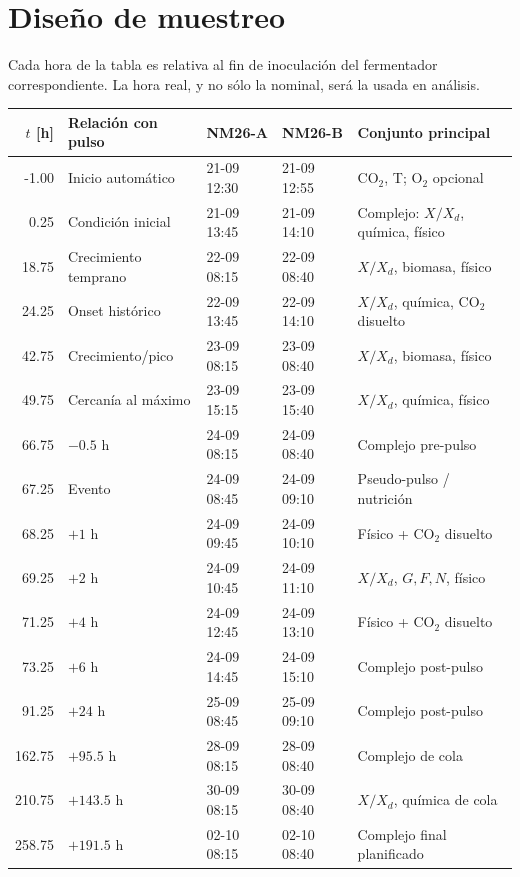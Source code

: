 \documentclass[11pt,a4paper]{article}
\begin{document}
\section{Diseño de muestreo}

Cada hora de la tabla es relativa al fin de inoculación del fermentador
correspondiente. La hora real, y no sólo la nominal, será la usada en análisis.

\begin{longtable}{@{}r l l l l@{}}
\toprule
\(t\) [h] & Relación con pulso & NM26-A & NM26-B & Conjunto principal\\
\midrule
\endhead
-1.00 & Inicio automático & 21-09 12:30 & 21-09 12:55 & CO$_2$, T; O$_2$ opcional\\
0.25 & Condición inicial & 21-09 13:45 & 21-09 14:10 & Complejo: \(X/X_d\), química, físico\\
18.75 & Crecimiento temprano & 22-09 08:15 & 22-09 08:40 & \(X/X_d\), biomasa, físico\\
24.25 & Onset histórico & 22-09 13:45 & 22-09 14:10 & \(X/X_d\), química, CO$_2$ disuelto\\
42.75 & Crecimiento/pico & 23-09 08:15 & 23-09 08:40 & \(X/X_d\), biomasa, físico\\
49.75 & Cercanía al máximo & 23-09 15:15 & 23-09 15:40 & \(X/X_d\), química, físico\\
66.75 & \(-0.5\) h & 24-09 08:15 & 24-09 08:40 & Complejo pre-pulso\\
67.25 & Evento & 24-09 08:45 & 24-09 09:10 & Pseudo-pulso / nutrición\\
68.25 & \(+1\) h & 24-09 09:45 & 24-09 10:10 & Físico + CO$_2$ disuelto\\
69.25 & \(+2\) h & 24-09 10:45 & 24-09 11:10 & \(X/X_d\), \(G,F,N\), físico\\
71.25 & \(+4\) h & 24-09 12:45 & 24-09 13:10 & Físico + CO$_2$ disuelto\\
73.25 & \(+6\) h & 24-09 14:45 & 24-09 15:10 & Complejo post-pulso\\
91.25 & \(+24\) h & 25-09 08:45 & 25-09 09:10 & Complejo post-pulso\\
162.75 & \(+95.5\) h & 28-09 08:15 & 28-09 08:40 & Complejo de cola\\
210.75 & \(+143.5\) h & 30-09 08:15 & 30-09 08:40 & \(X/X_d\), química de cola\\
258.75 & \(+191.5\) h & 02-10 08:15 & 02-10 08:40 & Complejo final planificado\\
\bottomrule
\end{longtable}
\end{document}
